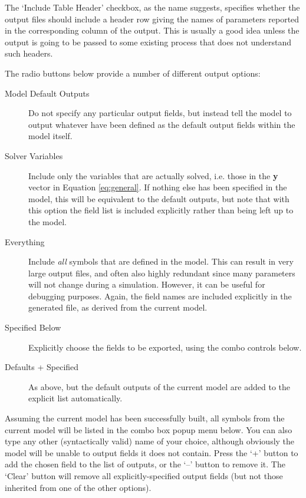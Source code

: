 \documentclass[a4paper,11pt]{article}
\begin{document}
The `Include Table Header' checkbox, as the name suggests, specifies whether the output files should include a header row giving the names of parameters reported in the corresponding column of the output. This is usually a good idea unless the output is going to be passed to some existing process that does not understand such headers.

The radio buttons below provide a number of different output options:

\begin{adjustwidth}{0.8cm}{0.8cm}
\begin{description}
\item[Model Default Outputs] Do not specify any particular output fields, but instead tell the model to output whatever have been defined as the default output fields within the model itself.
\item[Solver Variables] Include only the variables that are actually solved, i.e. those in the \textbf{y} vector in Equation \ref{eq:general}. If nothing else has been specified in the model, this will be equivalent to the default outputs, but note that with this option the field list is included explicitly rather than being left up to the model.
\item[Everything] Include \textit{all} symbols that are defined in the model. This can result in very large output files, and often also highly redundant since many parameters will not change during a simulation. However, it can be useful for debugging purposes. Again, the field names are included explicitly in the generated file, as derived from the current model.
\item[Specified Below] Explicitly choose the fields to be exported, using the combo controls below.
\item[Defaults + Specified] As above, but the default outputs of the current model are added to the explicit list automatically.
\end{description}
\end{adjustwidth}

Assuming the current model has been successfully built, all symbols from the current model will be listed in the combo box popup menu below. You can also type any other (syntactically valid) name of your choice, although obviously the model will be unable to output fields it does not contain. Press the `+' button to add the chosen field to the list of outputs, or the `--' button to remove it. The `Clear' button will remove all explicitly-specified output fields (but not those inherited from one of the other options).
\end{document}
